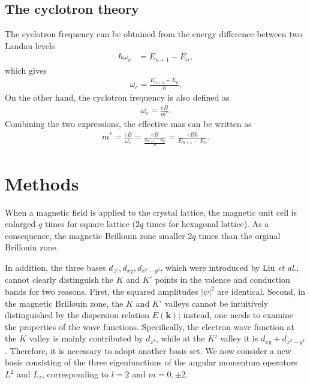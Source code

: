\documentclass{article}
\begin{document}
\subsection{The cyclotron theory}
The cyclotron frequency can be obtained from the energy difference between two Landau levels
\begin{equation}
	\begin{aligned}
		\hbar \omega_{c}       & = E_{n+1} - E_{n}  ,
	\end{aligned}
\end{equation}
which gives
\begin{equation}
	\begin{aligned}
		\omega_{c}  = \frac{E_{n+1} - E_{n}}{\hbar}.
	\end{aligned}
\end{equation}
On the other hand, the cyclotron frequency is also defined as
\begin{gather}
	\omega_{c}         = \frac{eB}{m^{*}}.
\end{gather}
Combining the two expressions, the effective mas can be written as 
\begin{gather}
	m^{*}  =  \frac{eB}{\omega_{c}} = \frac{eB}{\frac{E_{n+1} - E_{n}}{\hbar}} = \frac{eB \hbar}{E_{n+1} - E_{n}}.
\end{gather}
\section{Methods}

When a magnetic field is applied to the crystal lattice, the magnetic unit cell is enlarged $q$ times for square lattice ($2q$ times for hexagonal lattice). As a consequence, the magnetic Brillouin zone smaller $2q$ times than the orginal Brillouin zone.

In addition, the three bases $d_{z^{2}}, d_{xy}, d_{x^{2}-y^{2}}$, which were introduced by Liu \textit{et al.}, cannot clearly distinguish the $K$ and $K'$ points in the valence and conduction bands for two reasons. First, the squared amplitudes $|\psi|^{2}$ are identical. Second, in the magnetic Brillouin zone, the $K$ and $K'$ valleys cannot be intuitively distinguished by the dispersion relation $E(\mathbf{k})$; instead, one needs to examine the properties of the wave functions. Specifically, the electron wave function at the $K$ valley is mainly contributed by $d_{z^{2}}$, while at the $K'$ valley it is $d_{xy} + d_{x^{2}-y^{2}}$. Therefore, it is necessary to adopt another basis set. We now consider a new basis consisting of the three eigenfunctions of the angular momentum operators $L^{2}$ and $L_{z}$, corresponding to $l = 2$ and $m = 0, \pm 2$.
\end{document}
